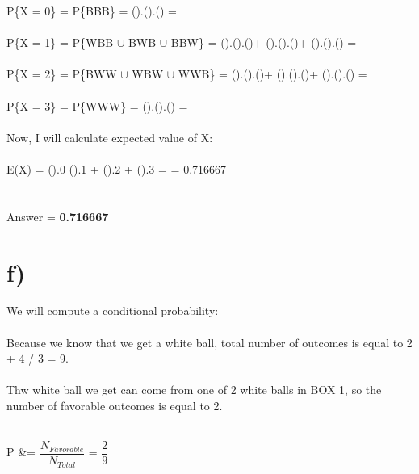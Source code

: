 \documentclass[11pt]{article}
\begin{document}
P\{X = 0\} = P\{BBB\} = ().().() =  \\ \\

P\{X = 1\} = P\{WBB $\cup$  BWB $\cup$ BBW\} = ().().()+
().().()+
().().() =  \\ \\

P\{X = 2\} = P\{BWW $\cup$ WBW $\cup$ WWB\} = 
().().()+
().().()+
().().() =  \\ \\

P\{X = 3\} = P\{WWW\} = ().().() =  \\ \\

\noindent Now, I will calculate expected value of X: \\ \\

E(X) = ().0 ().1 + ().2 +
().3 =  = 0.716667 \\ \\ \\

\noindent Answer = \textbf{0.716667} \newpage

\section*{f)}
We will compute a conditional probability: \\ \\

Because we know that we get a white ball, total number of outcomes is equal to
2 + 4 / 3 = 9. \\ \\

Thw white ball we get can come from one of 2 white balls in BOX 1, so the number of
favorable outcomes is equal to 2.  \\ \\

\begin{center}
    P &= $\dfrac{N_{Favorable}}{N_{Total}}$ = $\dfrac{2}{9}$
\end{center}
\end{document}
